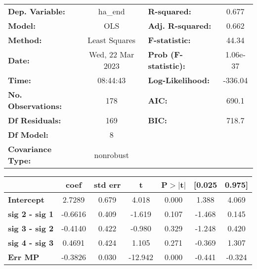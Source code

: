 \begin{center}
\begin{tabular}{lclc}
\toprule
\textbf{Dep. Variable:}    &     ha\_end      & \textbf{  R-squared:         } &    0.677  \\
\textbf{Model:}            &       OLS        & \textbf{  Adj. R-squared:    } &    0.662  \\
\textbf{Method:}           &  Least Squares   & \textbf{  F-statistic:       } &    44.34  \\
\textbf{Date:}             & Wed, 22 Mar 2023 & \textbf{  Prob (F-statistic):} & 1.06e-37  \\
\textbf{Time:}             &     08:44:43     & \textbf{  Log-Likelihood:    } &  -336.04  \\
\textbf{No. Observations:} &         178      & \textbf{  AIC:               } &    690.1  \\
\textbf{Df Residuals:}     &         169      & \textbf{  BIC:               } &    718.7  \\
\textbf{Df Model:}         &           8      & \textbf{                     } &           \\
\textbf{Covariance Type:}  &    nonrobust     & \textbf{                     } &           \\
\bottomrule
\end{tabular}
\end{center}\begin{center}
\begin{tabular}{lcccccc}
\toprule
                                & \textbf{coef} & \textbf{std err} & \textbf{t} & \textbf{P$> |$t$|$} & \textbf{[0.025} & \textbf{0.975]}  \\
\midrule
\textbf{Intercept}              &       2.7289  &        0.679     &     4.018  &         0.000        &        1.388    &        4.069     \\
\textbf{sig 2 - sig 1}          &      -0.6616  &        0.409     &    -1.619  &         0.107        &       -1.468    &        0.145     \\
\textbf{sig 3 - sig 2}          &      -0.4140  &        0.422     &    -0.980  &         0.329        &       -1.248    &        0.420     \\
\textbf{sig 4 - sig 3}          &       0.4691  &        0.424     &     1.105  &         0.271        &       -0.369    &        1.307     \\
\textbf{Err MP}                 &      -0.3826  &        0.030     &   -12.942  &         0.000        &       -0.441    &       -0.324     \\

\end{tabular}
\end{center}
